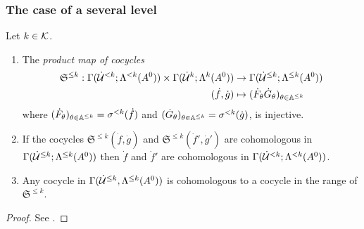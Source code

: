 \subsubsection{The case of a several level}
\begin{comment}
  \cite[II.3.3]{Loday1994}
\end{comment}
\begin{lem}
  Let $k\in\mathcal{K}$.
  \begin{enumerate}
    \item The \emph{product map of cocycles}
      \begin{align*}
        \mathfrak{S}^{\leq k}:
        \Gamma(\dot{\mathcal{U}}^{<k};\Lambda^{<k}(A^0))
        \times
        \Gamma(\dot{\mathcal{U}}^{k};\Lambda^{k}(A^0))
        &\to
        \Gamma(\dot{\mathcal{U}}^{\leq k};\Lambda^{\leq k}(A^0))
      \\(\dot f, \dot g)
        &\mapsto
        (\dot F_\theta\dot G_\theta)_{\theta\in\mathbb{A}^{\leq k}}
      \end{align*}
      where $(\dot F_\theta)_{\theta\in\mathbb{A}^{\leq k}}=\sigma^{<k}(\dot f)$ and
      $(\dot G_\theta)_{\theta\in\mathbb{A}^{\leq k}}=\sigma^{<k}(\dot g)$, is
      injective.
    \item If the cocycles $\mathfrak{S}^{\leq k}(\dot f,\dot g)$ and
      $\mathfrak{S}^{\leq k}(\dot f',\dot g')$ are cohomologous in
      $\Gamma(\dot{\mathcal{U}}^{\leq k};\Lambda^{\leq k}(A^0))$
      then $\dot f$ and $\dot f'$ are cohomologous in
      $\Gamma(\dot{\mathcal{U}}^{<k};\Lambda^{<k}(A^0))$.
    \item Any cocycle in $\Gamma(\dot{\mathcal{U}}^{\leq k},\Lambda^{\leq k}(A^0))$ is
      cohomologous to a cocycle in the range of $\mathfrak{S}^{\leq k}$.
  \end{enumerate}
\end{lem}
\begin{proof}
  See \cite[Lem.II.3.3]{Loday1994}.
  \TODO{}
\end{proof}

